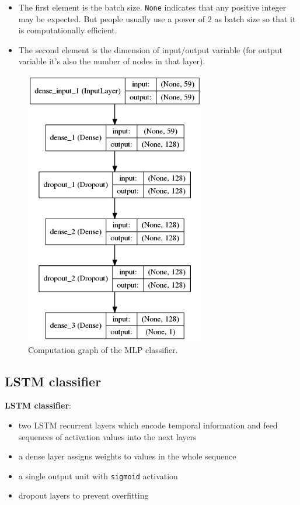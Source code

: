 \documentclass[11pt,a4paper]{report}
\begin{document}
\begin{itemize}
  \item The first element is the batch size.
    \texttt{None} indicates that any positive integer may be expected.
    But people usually use a power of 2 as batch size so that it is computationally efficient.
  \item The second element is the dimension of input/output variable (for output variable it's also the number of nodes in that layer).
\end{itemize}

\begin{figure}[htbp]
  \centering
  \includegraphics[width=0.7\textwidth]{model-mlp.png}
  \caption{Computation graph of the MLP classifier.} \label{fig:mlp}
\end{figure}

\newpage

\subsection{LSTM classifier}

\begin{mdframed}
\noindent \textbf{LSTM classifier}:
\begin{itemize}
  \item two LSTM recurrent layers which encode temporal information and feed sequences of activation values into the next layers
  \item a dense layer assigns weights to values in the whole sequence
  \item a single output unit with \texttt{sigmoid} activation
  \item dropout layers to prevent overfitting
\end{itemize}
\end{mdframed}
\end{document}
